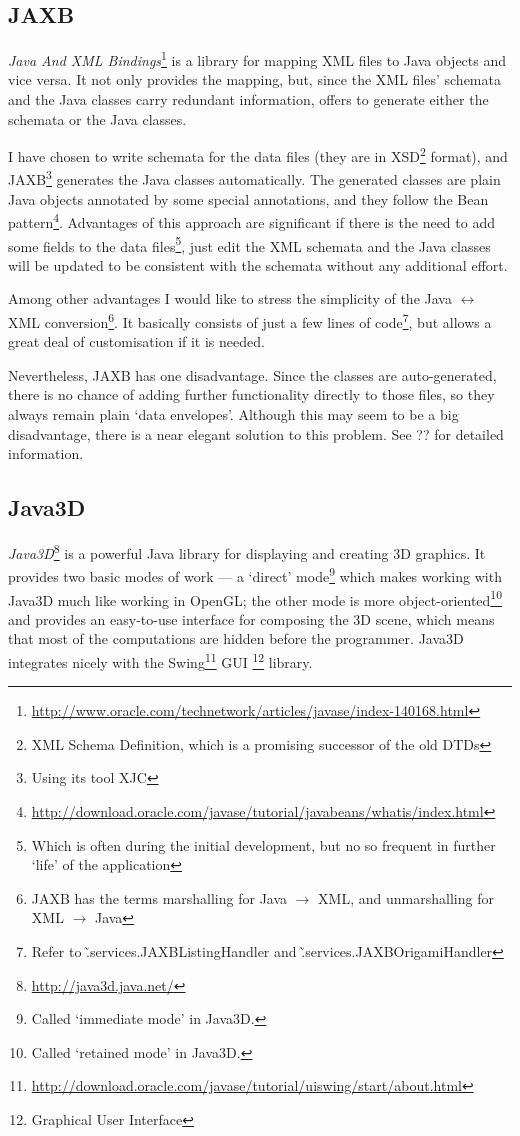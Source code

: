 \subsection{JAXB}
\emph{Java And XML Bindings}\footnote{\url{http://www.oracle.com/technetwork/articles/javase/index-140168.html}} is a library for mapping XML files to Java objects and vice versa. It not only provides the mapping, but, since the XML files' schemata and the Java classes carry redundant information, offers to generate either the schemata or the Java classes.

I have chosen to write schemata for the data files (they are in XSD\footnote{XML Schema Definition, which is a promising successor of the old DTDs} format),
and JAXB\footnote{Using its tool XJC} generates the Java classes automatically. The generated classes are plain Java objects annotated by some special annotations, and they follow the Bean pattern\footnote{\url{http://download.oracle.com/javase/tutorial/javabeans/whatis/index.html}}.  Advantages of this approach are significant if there is the need to add some fields to the data files\footnote{Which is often during the initial development, but no so frequent in further `life' of the application}, just edit the XML schemata and the Java classes will be updated to be consistent with the schemata without any additional effort.

Among other advantages I would like to stress the simplicity of the Java $\leftrightarrow$ XML conversion\footnote{JAXB has the terms marshalling for Java $\rightarrow$ XML, and unmarshalling for XML $\rightarrow$ Java}. It basically consists of just a few lines of code\footnote{Refer to \~.services.JAXBListingHandler and \~.services.JAXBOrigamiHandler}, but allows a great deal of customisation if it is needed.

Nevertheless, JAXB has one disadvantage. Since the classes are auto-generated,
there is no chance of adding further functionality directly to those files, so they always remain plain `data envelopes'.  Although this may seem to be a big disadvantage, there is a near elegant solution to this problem.  See ??  for detailed information. %

\subsection{Java3D}
\emph{Java3D}\footnote{\url{http://java3d.java.net/}} is a powerful Java library for displaying and creating 3D graphics. It provides two basic modes of work --- a `direct' mode\footnote{Called `immediate mode' in Java3D.} which makes working
with Java3D much like working in OpenGL; the other mode is more object-oriented\footnote{Called `retained mode' in Java3D.} and provides an easy-to-use interface for composing the 3D scene, which means that most of the computations are hidden before the programmer. Java3D integrates nicely with the Swing\footnote{\url{http://download.oracle.com/javase/tutorial/uiswing/start/about.html}} GUI \footnote{ Graphical User Interface} library.

